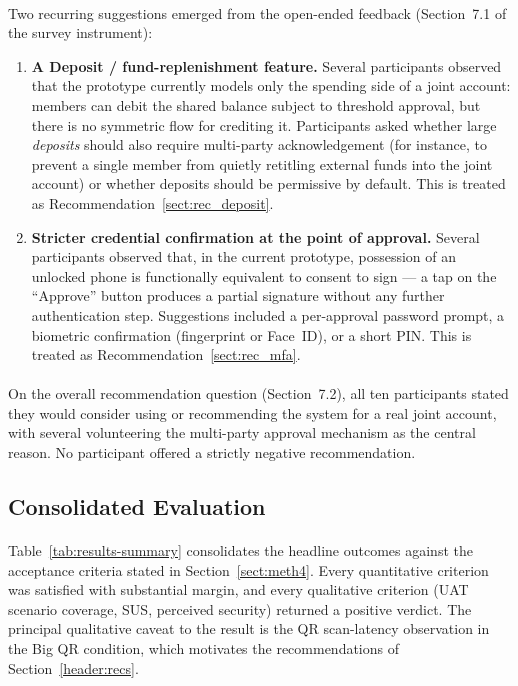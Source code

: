 \paragraph{}Two recurring suggestions emerged from the open-ended feedback (Section~7.1 of the survey instrument):

\begin{enumerate}
  \item \textbf{A Deposit / fund-replenishment feature.} Several participants observed that the prototype currently models only the spending side of a joint account: members can debit the shared balance subject to threshold approval, but there is no symmetric flow for crediting it. Participants asked whether large \textit{deposits} should also require multi-party acknowledgement (for instance, to prevent a single member from quietly retitling external funds into the joint account) or whether deposits should be permissive by default. This is treated as Recommendation~\ref{sect:rec_deposit}.
  \item \textbf{Stricter credential confirmation at the point of approval.} Several participants observed that, in the current prototype, possession of an unlocked phone is functionally equivalent to consent to sign --- a tap on the ``Approve'' button produces a partial signature without any further authentication step. Suggestions included a per-approval password prompt, a biometric confirmation (fingerprint or Face~ID), or a short PIN. This is treated as Recommendation~\ref{sect:rec_mfa}.
\end{enumerate}

\paragraph{}On the overall recommendation question (Section~7.2), all ten participants stated they would consider using or recommending the system for a real joint account, with several volunteering the multi-party approval mechanism as the central reason. No participant offered a strictly negative recommendation.

\subsection{Consolidated Evaluation}
\label{sect:results_summary}

\paragraph{}Table~\ref{tab:results-summary} consolidates the headline outcomes against the acceptance criteria stated in Section~\ref{sect:meth4}. Every quantitative criterion was satisfied with substantial margin, and every qualitative criterion (UAT scenario coverage, SUS, perceived security) returned a positive verdict. The principal qualitative caveat to the result is the QR scan-latency observation in the Big QR condition, which motivates the recommendations of Section~\ref{header:recs}.

